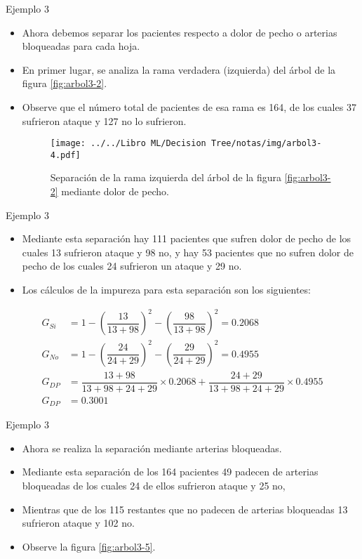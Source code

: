 \documentclass[11pt,aspectratio=169]{beamer}
\begin{document}
\begin{frame}{Ejemplo 3}
	\begin{itemize}
		\item Ahora debemos separar los pacientes respecto a dolor de pecho o arterias 
			bloqueadas para cada hoja.\pause  
		\item En primer lugar, se analiza la rama verdadera (izquierda) del árbol de la figura 
			\ref{fig:arbol3-2}.\pause
		\item Observe que el número total de pacientes de esa rama es 164, de los cuales 37 
			sufrieron ataque y 127 no lo sufrieron.
		\begin{figure}[H]
			\centering
			\texttt{[image: ../../Libro ML/Decision Tree/notas/img/arbol3-4.pdf]}
			\caption{Separación de la rama izquierda del árbol de la figura \ref{fig:arbol3-2} mediante dolor de pecho.}
			\label{fig:arbol3-4}
		\end{figure}
	\end{itemize}
\end{frame}

\begin{frame}{Ejemplo 3}
	\begin{itemize}
		\item Mediante esta separación hay 111 pacientes que sufren dolor de pecho de los cuales 13 
			sufrieron ataque y 98 no, y hay 53 pacientes que no sufren dolor de pecho de los cuales 
			24 sufrieron un ataque y 29 no. \pause
		\item Los cálculos de la impureza para esta separación son los siguientes: \pause
	\end{itemize}
\begin{align*}
	G_{Si} &= 1 - \left(\dfrac{13}{13+98}\right)^2 - \left(\dfrac{98}{13+98}\right)^2 = 0.2068\\
	G_{No} &= 1 - \left(\dfrac{24}{24+29}\right)^2 - \left(\dfrac{29}{24+29}\right)^2 = 0.4955\\
	G_{DP} &= \dfrac{13+98}{13+98+24+29}\times 0.2068 + \dfrac{24+29}{13+98+24+29}\times 0.4955\\
	G_{DP} &= 0.3001
\end{align*}
\end{frame}

\begin{frame}{Ejemplo 3}
	\begin{itemize}
		\item Ahora se realiza la separación mediante arterias bloqueadas.\pause
		\item Mediante esta separación de los 164 pacientes 49 padecen de arterias bloqueadas de los cuales 24 de ellos sufrieron 
			ataque y 25 no\pause,
		\item Mientras que de los 115 restantes que no padecen de arterias bloqueadas 13 sufrieron ataque y 102 no.\pause
		\item Observe la figura \ref{fig:arbol3-5}.\pause
	\end{itemize}
\end{frame}
\end{document}
